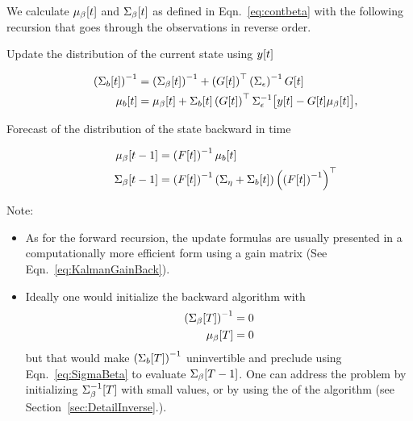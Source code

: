 We calculate ${\mu_\beta}{[t]}$ and ${\Sigma_\beta}{[t]}$ as defined
in Eqn.~\eqref{eq:contbeta} with the following recursion that goes
through the observations in reverse order.

\begin{description}
\item[Update the distribution of the current state using ${y}{[t]}$]
  \begin{subequations}
    \label{eq:BUpdate}
    \begin{align}
    \left({\Sigma_b}{[t]} \right)^{-1} &= \left({\Sigma_\beta}{[t]}
    \right)^{-1} + \left( {G}{[t]} \right)^\top
    \left(\Sigma_\epsilon
    \right)^{-1} {G}{[t]} \\
        {\mu_b}{[t]} &= {\mu_\beta}{[t]} + {\Sigma_{b}}{[t]}
        \left( {G}{[t]} \right)^\top \Sigma_\epsilon^{-1}
        \big[{y}{[t]} - {G}{[t]} {\mu_\beta}{[t]}\big],
  \end{align}
  \end{subequations}
\item[Forecast of the distribution of the state backward in time]
  \begin{subequations}
    \label{eq:BFore}
    \begin{align}
      {\mu_\beta}{[t-1]} &= \left( {F}{[t]} \right)^{-1}
      {\mu_b}{[t]} \\
      \label{eq:SigmaBeta}
      {\Sigma_\beta}{[t-1]} &= \left( {F}{[t]} \right)^{-1} \left(
        \Sigma_\eta + {\Sigma_b}{[t]} \right) \left( \left( {F}{[t]}
        \right)^{-1} \right)^\top
    \end{align}
  \end{subequations}
\end{description}
Note:
\begin{itemize}
\item As for the forward recursion, the update formulas are usually
  presented in a computationally more efficient form using a gain
  matrix (See Eqn.~\eqref{eq:KalmanGainBack}).
\item Ideally one would initialize the backward algorithm with
  \begin{align*}
    \left( {\Sigma_\beta}{[T]} \right)^{-1} &= 0\\
    {\mu_\beta}{[T]} &= 0
  \end{align*}
  but that would make $\left( {\Sigma_b}{[T]} \right)^{-1}$
  uninvertible and preclude using Eqn.~\eqref{eq:SigmaBeta} to
  evaluate ${\Sigma_\beta}{[T-1]}$.  One can address the problem by
  initializing ${\Sigma_\beta^{-1}}{[T]}$ with small values, or by using
  the \emph{} of the algorithm (see
  Section~\ref{sec:DetailInverse}.).
\end{itemize}

